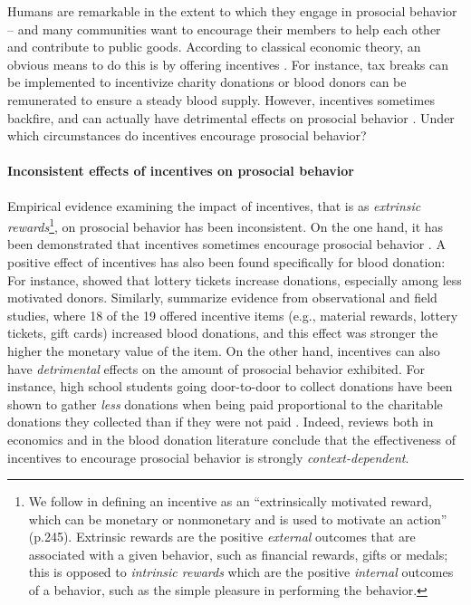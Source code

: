 \documentclass[AER]{AEA}
\begin{document}
\maketitle

Humans are remarkable in the extent to which they engage in prosocial behavior -- and many communities want to encourage their members to help each other and contribute to public goods. According to classical economic theory, an obvious means to do this is by offering incentives \citep{mill_principles_1882}. For instance, tax breaks can be implemented to incentivize charity donations or blood donors can be remunerated to ensure a steady blood supply. However, incentives sometimes backfire, and can actually have detrimental effects on prosocial behavior \citep{deci_effects_1971, gneezy_pay_2000, gneezy_fine_2000}. Under which circumstances do incentives encourage prosocial behavior?

\paragraph{Inconsistent effects of incentives on prosocial behavior}

Empirical evidence examining the impact of incentives, that is as \textit{extrinsic rewards}\footnote{We follow \cite{chell_systematic_2018} in defining an incentive as an “extrinsically motivated reward, which can be monetary or nonmonetary and is used to motivate an action” (p.245). Extrinsic rewards are the positive \textit{external} outcomes that are associated with a given behavior, such as financial rewards, gifts or medals; this is opposed to \textit{intrinsic rewards} which are the positive \textit{internal} outcomes of a behavior, such as the simple pleasure in performing the behavior.}, on prosocial behavior has been inconsistent. On the one hand, it has been demonstrated that incentives sometimes encourage prosocial behavior \cite[e.g., tax breaks increase charitable giving; ][]{duquette_tax_2016}. A positive effect of incentives has also been found specifically for blood donation: For instance, \cite{goette_blood_2020} showed that lottery tickets increase donations, especially among less motivated donors. Similarly, \cite{lacetera_economic_2013} summarize evidence from observational and field studies, where 18 of the 19 offered incentive items (e.g., material rewards, lottery tickets, gift cards) increased blood donations, and this effect was stronger the higher the monetary value of the item. On the other hand, incentives can also have \textit{detrimental} effects on the amount of prosocial behavior exhibited. For instance, high school students going door-to-door to collect donations have been shown to gather \textit{less} donations when being paid proportional to the charitable donations they collected than if they were not paid \citep{gneezy_pay_2000}. Indeed, reviews both in economics \citep{gneezy_when_2011} and in the blood donation literature \citep{chell_systematic_2018} conclude that the effectiveness of incentives to encourage prosocial behavior is strongly \textit{context-dependent}. 
\end{document}
